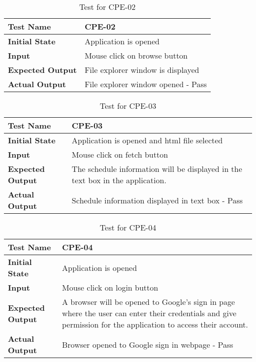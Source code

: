 \documentclass[12pt, titlepage]{article}
\begin{document}
		\begin{table}[!htbp]
			
			\begin{tabularx}{\textwidth}{|l|X|}
				\hline
				
				\textbf{Test Name} & CPE-02
				\\ 
				\hline
				\textbf{Initial State} & Application is opened \\ 
				\hline
				\textbf{Input} & Mouse click on browse button  \\ 
				\hline 
				\textbf{Expected Output} & File explorer window is displayed \\ 
				\hline
				\textbf{Actual Output} & File explorer window opened - Pass\\
				\hline
				
			\end{tabularx}
			\caption{Test for CPE-02}
			\label{Table}
		\end{table}
		
				
		\begin{table}[!htbp]
			
			\begin{tabularx}{\textwidth}{|l|X|}
				\hline
				
				\textbf{Test Name} & CPE-03
				\\ 
				\hline
				\textbf{Initial State} & Application is opened and html file selected\\ 
				\hline
				\textbf{Input} & Mouse click on fetch button  \\ 
				\hline 
				\textbf{Expected Output} & The schedule information will be displayed in the text box in the application.  \\ 
				\hline
				\textbf{Actual Output} & Schedule information displayed in text box - Pass\\
				\hline
			\end{tabularx}
			\caption{Test for CPE-03}
			\label{Table}
		\end{table}
		
				
		\begin{table}[!htbp]
			
			\begin{tabularx}{\textwidth}{|l|X|}
				\hline
				
				\textbf{Test Name} & CPE-04
				\\ 
				\hline
				\textbf{Initial State} & Application is opened \\ 
				\hline
				\textbf{Input} & Mouse click on login button  \\ 
				\hline 
				\textbf{Expected Output} & A browser will be opened to Google’s sign in page where the user can enter their credentials and give permission for the application to access their account. \\ 
				\hline
				\textbf{Actual Output} & Browser opened to Google sign in webpage - Pass\\
				\hline
				
			\end{tabularx}
			\caption{Test for CPE-04}
			\label{Table}
		\end{table}
		
\end{document}
